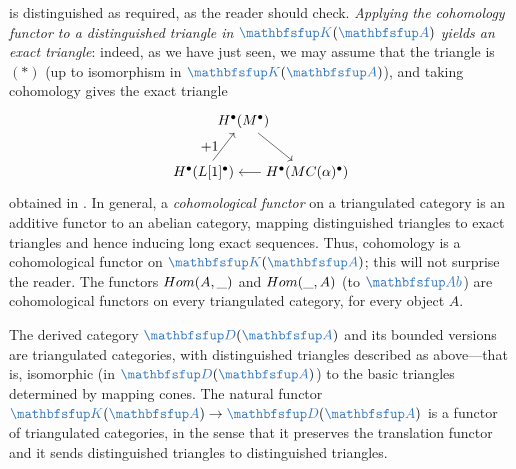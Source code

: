 is distinguished as required, as the reader should check.
\emph{Applying the cohomology functor to a distinguished triangle in
  $\categ{K}(\categ{A})$ yields an exact triangle}: indeed, as we have
just seen, we may assume that the triangle is $(*)$ (up to isomorphism
in $\categ{K}(\categ{A})$), and taking cohomology gives the exact
triangle
\[
  \begin{tikzpicture}[baseline=(current bounding box.center)]
    \node (M) at (1,1.3)
    {$H^\bullet(M^\bullet)$}; \node (L1) at (0,0)
    {$H^\bullet(L[1]^\bullet)$}; \node (MC) at (2.6,0)
    {$H^\bullet(MC(\alpha)^\bullet)$}; \draw[->] (M) -- (MC);
    \draw[->] (MC) -- (L1); \draw[->] (L1) -- (M) node[midway, left]
    {$+1$};
  \end{tikzpicture}
\]
obtained in . In general, a
\emph{cohomological functor} on a triangulated category is an additive
functor to an abelian category, mapping distinguished triangles to
exact triangles and hence inducing long exact sequences. Thus,
cohomology is a cohomological functor on $\categ{K}(\categ{A})$; this
will not surprise the reader. The functors $Hom(A,\_)$ and
$Hom(\_,A)$ (to $\categ{Ab}$) are cohomological functors on every
triangulated category, for every object $A$.

The derived category $\categ{D}(\categ{A})$ and its bounded versions
are triangulated categories, with distinguished triangles described as
above---that is, isomorphic (in $\categ{D}(\categ{A})$) to the basic
triangles determined by mapping cones. The natural functor
$\categ{K}(\categ{A}) \to \categ{D}(\categ{A})$ is a functor of
triangulated categories, in the sense that it preserves the
translation functor and it sends distinguished triangles to
distinguished triangles.

